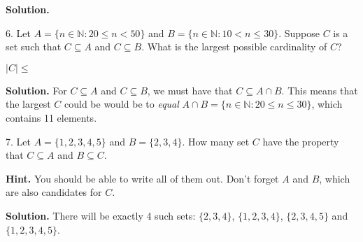\documentclass[12pt,]{book}
\theoremstyle{plain}
\theoremstyle{definition}
\theoremstyle{definition}
\theoremstyle{definition}
\numberwithin{equation}{chapter}
\newcommand{\N}{\mathbb N}
\newcommand{\st}{:}
\newcommand{\card}[1]{\left| #1 \right|}
\newcommand{\lt}{<}
\begin{document}
\begin{exerciselist}
\par
\medskip\noindent%
\textbf{Solution.}\quad \hypertarget{p-643}{}%
%
\par
\item[6.]\hypertarget{exercise-71}{}\noindent%
\hypertarget{p-644}{}%
Let \(A = \{n \in \N \st 20 \le n \lt 50\}\) and \(B = \{n \in \N \st 10 \lt n \le 30\}\). Suppose \(C\) is a set such that \(C \subseteq A\) and \(C \subseteq B\).  What is the largest possible cardinality of \(C\)?%
\par
\hypertarget{p-645}{}%
\(\card{C} \le \) \framebox[6em]{\raisebox{1ex}{}}%
\par
\medskip\noindent%
\textbf{Solution.}\quad \hypertarget{p-646}{}%
For \(C \subseteq A\) and \(C \subseteq B\), we must have that \(C \subseteq A \cap B\).  This means that the largest \(C\) could be would be to \emph{equal} \(A \cap B = \{n \in \N \st 20 \le n \le 30\}\), which contains 11 elements.%
\par
\item[7.]\hypertarget{exercise-72}{}\noindent%
\hypertarget{p-647}{}%
Let \(A = \{1,2,3,4,5\}\) and \(B = \{2, 3, 4\}\).  How many set \(C\) have the property that \(C \subseteq A\) and \(B \subseteq C\).%
\par
\hypertarget{p-648}{}%
 \framebox[5em]{\raisebox{1ex}{}}%
\par
\medskip\noindent%
\textbf{Hint.}\quad \hypertarget{p-649}{}%
You should be able to write all of them out.  Don't forget \(A\) and \(B\), which are also candidates for \(C\).%
\par
\medskip\noindent%
\textbf{Solution.}\quad \hypertarget{p-650}{}%
There will be exactly 4 such sets: \(\{2, 3, 4\}\), \(\{1,2,3,4\}\), \(\{2,3,4,5\}\) and \(\{1,2,3,4,5\}\).%
\par
\end{exerciselist}
\typeout{************************************************}
\typeout{************************************************}
\end{document}
